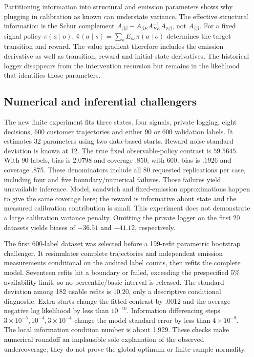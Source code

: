 Partitioning information into structural and emission parameters shows why
plugging in calibration as known can understate variance. The effective
structural information is the Schur complement
$A_{\beta\beta}-A_{\beta E}A_{EE}^{-1}A_{E\beta}$, not
$A_{\beta\beta}$. For a fixed signal policy $\pi(a\mid o)$,
$\bar\pi(a\mid s)=\sum_oE_{os}\pi(a\mid o)$ determines the target
transition and reward. The value gradient therefore includes the emission
derivative as well as transition, reward and initial-state derivatives.
The historical logger disappears from the intervention recursion but remains
in the likelihood that identifies those parameters.

\subsection{Numerical and inferential challengers}
The new finite experiment fits three states, four signals, private logging,
eight decisions, 600 customer trajectories and either 90 or 600 validation
labels. It estimates 32 parameters using two data-based starts. Reward noise
standard deviation is known at 12. The true fixed observable-policy contrast
is $59.5645$. With 90 labels, bias is $2.0798$ and coverage .850; with 600,
bias is $.1926$ and coverage .875. These denominators include all 80 requested
replications per case, including four and five boundary/numerical failures.
Those failures yield unavailable inference. Model, sandwich and
fixed-emission approximations happen to give the same coverage here; the
reward is informative about state and the measured calibration contribution
is small. This experiment does not demonstrate a large calibration variance
penalty. Omitting the private logger on the first 20 datasets yields biases
of $-36.51$ and $-41.12$, respectively.

The first 600-label dataset was selected before a 199-refit parametric
bootstrap challenger. It resimulates complete trajectories and independent
emission measurements conditional on the audited label counts, then refits
the complete model. Seventeen refits hit a boundary or failed, exceeding the
prespecified 5\% availability limit, so no percentile/basic interval is
released. The standard deviation among 182 usable refits is $10.20$, only a
descriptive conditional diagnostic. Extra starts change the fitted contrast
by $.0012$ and the average negative log likelihood by less than $10^{-10}$.
Information differencing steps $3\times10^{-5},10^{-4},3\times10^{-4}$
change the model standard error by less than $4\times10^{-8}$. The local
information condition number is about 1,929. These checks make numerical
roundoff an implausible sole explanation of the observed undercoverage;
they do not prove the global optimum or finite-sample normality.

